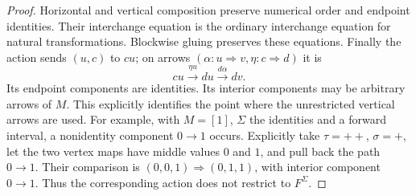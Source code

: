 \begin{proof}
Horizontal and vertical composition preserve numerical order and
endpoint identities. Their interchange equation is the ordinary
interchange equation for natural transformations. Blockwise gluing
preserves these equations. Finally the action sends $(u,c)$ to $cu$;
on arrows $(\alpha:u\Rightarrow v,\eta:c\Rightarrow d)$ it is
\[
 cu\xrightarrow{\eta u}du\xrightarrow{d\alpha}dv.
\]
Its endpoint components are identities. Its interior components may
be arbitrary arrows of $M$. This explicitly identifies the point where
the unrestricted vertical arrows are used. For example, with
$M=[1]$, $\Sigma$ the identities and a forward interval, a nonidentity
component $0\to1$ occurs. Explicitly take $\tau=++$, $\sigma=+$,
let the two vertex maps have middle values $0$ and $1$, and pull
back the path $0\to1$. Their comparison is
$(0,0,1)\Rightarrow(0,1,1)$, with interior component $0\to1$.
Thus the corresponding action does not restrict to $F^\Sigma$.
\end{proof}


